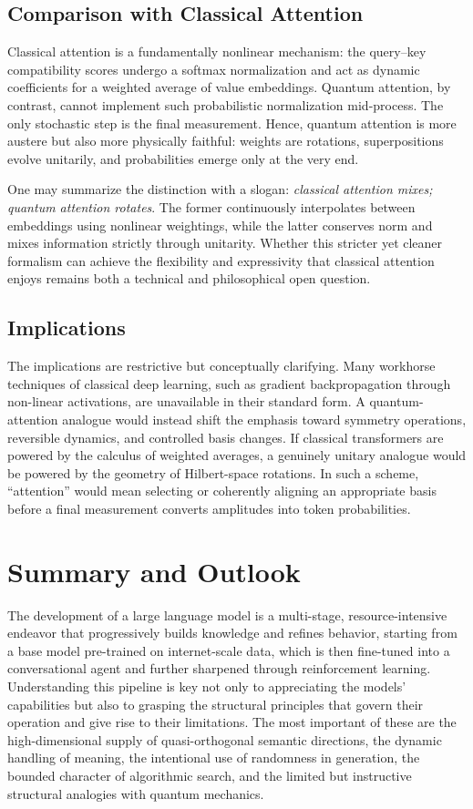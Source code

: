 \documentclass[%
  reprint,
  superscriptaddress,
  showpacs,
  showkeys,
  amsmath,amssymb,
  pra,
  longbibliography,
  floatfix,
  x11names
]{revtex4-2}
\begin{document}
\subsection{Comparison with Classical Attention}

Classical attention is a fundamentally nonlinear mechanism:
the query--key compatibility scores undergo a softmax normalization
and act as dynamic coefficients for a weighted average of value embeddings.
Quantum attention, by contrast, cannot implement such probabilistic normalization
mid-process. The only stochastic step is the final measurement.
Hence, quantum attention is more austere but also more physically faithful:
weights are rotations, superpositions evolve unitarily,
and probabilities emerge only at the very end.

One may summarize the distinction with a slogan:
\emph{classical attention mixes; quantum attention rotates}.
The former continuously interpolates between embeddings using nonlinear weightings,
while the latter conserves norm and mixes information strictly through unitarity.
Whether this stricter yet cleaner formalism can achieve the flexibility and
expressivity that classical attention enjoys remains both a technical and
philosophical open question.

\subsection{Implications}

The implications are restrictive but conceptually clarifying.
Many workhorse techniques of classical deep learning,
such as gradient backpropagation through non-linear activations,
are unavailable in their standard form. A quantum-attention analogue would instead shift the emphasis toward symmetry operations, reversible dynamics,
and controlled basis changes.
If classical transformers are powered by the calculus of weighted averages,
a genuinely unitary analogue would be powered by the geometry of Hilbert-space rotations.
In such a scheme, ``attention'' would mean selecting or coherently aligning an appropriate basis before a final measurement converts amplitudes into token probabilities.

\section{Summary and Outlook}

The development of a large language model is a multi-stage, resource-intensive endeavor that progressively builds knowledge and refines behavior, starting from a base model pre-trained on internet-scale data, which is then fine-tuned into a conversational agent and further sharpened through reinforcement learning. Understanding this pipeline is key not only to appreciating the models' capabilities but also to grasping the structural principles that govern their operation and give rise to their limitations. The most important of these are the high-dimensional supply of quasi-orthogonal semantic directions, the dynamic handling of meaning, the intentional use of randomness in generation, the bounded character of algorithmic search, and the limited but instructive structural analogies with quantum mechanics.
\end{document}
